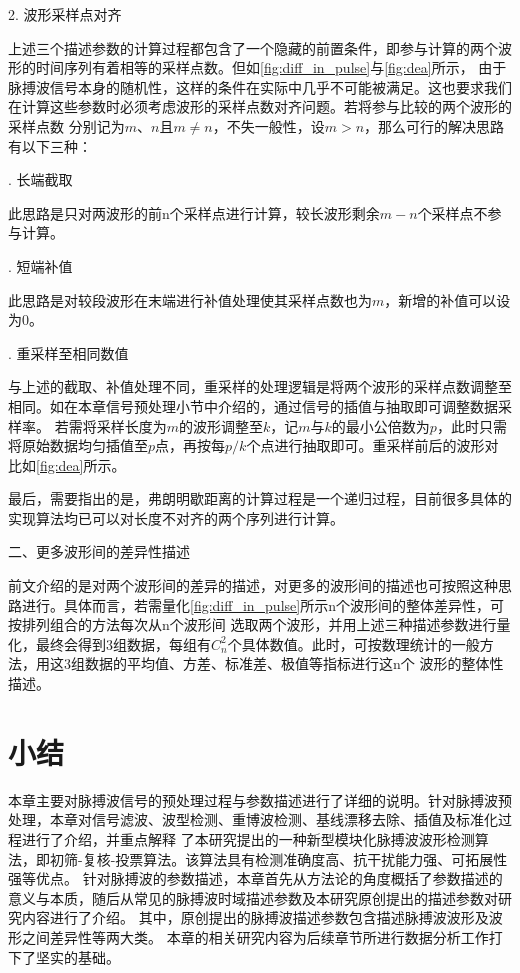 2. 波形采样点对齐

上述三个描述参数的计算过程都包含了一个隐藏的前置条件，即参与计算的两个波形的时间序列有着相等的采样点数。但如\autoref{fig:diff_in_pulse}与\autoref{fig:dea}所示，
由于脉搏波信号本身的随机性，这样的条件在实际中几乎不可能被满足。这也要求我们在计算这些参数时必须考虑波形的采样点数对齐问题。若将参与比较的两个波形的采样点数
分别记为$m$、$n$且$m \neq n$，不失一般性，设$m>n$，那么可行的解决思路有以下三种：

. 长端截取

此思路是只对两波形的前n个采样点进行计算，较长波形剩余$m-n$个采样点不参与计算。

. 短端补值

此思路是对较段波形在末端进行补值处理使其采样点数也为$m$，新增的补值可以设为0。

. 重采样至相同数值

与上述的截取、补值处理不同，重采样的处理逻辑是将两个波形的采样点数调整至相同。如在本章信号预处理小节中介绍的，通过信号的插值与抽取即可调整数据采样率。
若需将采样长度为$m$的波形调整至$k$，记$m$与$k$的最小公倍数为$p$，此时只需将原始数据均匀插值至$p$点，再按每$p/k$个点进行抽取即可。重采样前后的波形对比如\autoref{fig:dea}所示。

最后，需要指出的是，弗朗明歇距离的计算过程是一个递归过程，目前很多具体的实现算法均已可以对长度不对齐的两个序列进行计算\cite{derohde2022}。

二、更多波形间的差异性描述

前文介绍的是对两个波形间的差异的描述，对更多的波形间的描述也可按照这种思路进行。具体而言，若需量化\autoref{fig:diff_in_pulse}所示n个波形间的整体差异性，可按排列组合的方法每次从n个波形间
选取两个波形，并用上述三种描述参数进行量化，最终会得到3组数据，每组有$C_n^2$个具体数值。此时，可按数理统计的一般方法，用这3组数据的平均值、方差、标准差、极值等指标进行这n个
波形的整体性描述。

\section{小结}
本章主要对脉搏波信号的预处理过程与参数描述进行了详细的说明。针对脉搏波预处理，本章对信号滤波、波型检测、重博波检测、基线漂移去除、插值及标准化过程进行了介绍，并重点解释
了本研究提出的一种新型模块化脉搏波波形检测算法，即初筛-复核-投票算法。该算法具有检测准确度高、抗干扰能力强、可拓展性强等优点。
针对脉搏波的参数描述，本章首先从方法论的角度概括了参数描述的意义与本质，随后从常见的脉搏波时域描述参数及本研究原创提出的描述参数对研究内容进行了介绍。
其中，原创提出的脉搏波描述参数包含描述脉搏波波形及波形之间差异性等两大类。
本章的相关研究内容为后续章节所进行数据分析工作打下了坚实的基础。